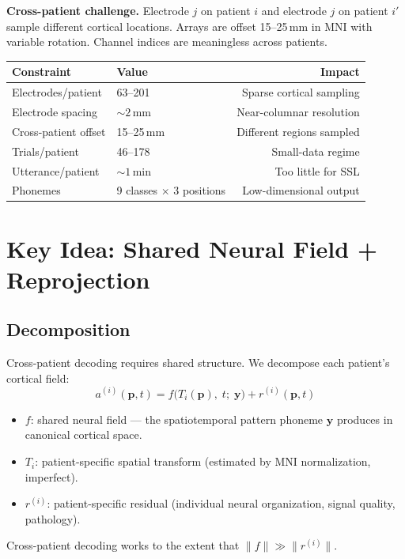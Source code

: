 \documentclass[11pt,letterpaper]{article}
\newcommand{\bfp}{\mathbf{p}}
\newcommand{\bfy}{\mathbf{y}}
\begin{document}
\textbf{Cross-patient challenge.} Electrode $j$ on patient $i$ and electrode $j$ on patient $i'$ sample different cortical locations. Arrays are offset 15--25\,mm in MNI with variable rotation. Channel indices are meaningless across patients.

\begin{table}[ht!]
\centering\small
\begin{tabular}{@{}llr@{}}
\toprule
\textbf{Constraint} & \textbf{Value} & \textbf{Impact} \\
\midrule
Electrodes/patient & 63--201 & Sparse cortical sampling \\
Electrode spacing & ${\sim}2$\,mm & Near-columnar resolution \\
Cross-patient offset & 15--25\,mm & Different regions sampled \\
Trials/patient & 46--178 & Small-data regime \\
Utterance/patient & ${\sim}1$\,min & Too little for SSL \\
Phonemes & 9 classes $\times$ 3 positions & Low-dimensional output \\
\bottomrule
\end{tabular}
\end{table}



\section{Key Idea: Shared Neural Field + Reprojection}\label{sec:idea}

\subsection{Decomposition}

Cross-patient decoding requires shared structure. We decompose each patient's cortical field:
\begin{equation}\label{eq:decomposition}
a^{(i)}(\bfp, t) = f\bigl(T_i(\bfp),\; t;\; \bfy\bigr) + r^{(i)}(\bfp, t)
\end{equation}
\begin{itemize}[leftmargin=2em]
\item $f$: shared neural field --- the spatiotemporal pattern phoneme $\bfy$ produces in canonical cortical space.
\item $T_i$: patient-specific spatial transform (estimated by MNI normalization, imperfect).
\item $r^{(i)}$: patient-specific residual (individual neural organization, signal quality, pathology).
\end{itemize}
Cross-patient decoding works to the extent that $\|f\| \gg \|r^{(i)}\|$.
\end{document}
